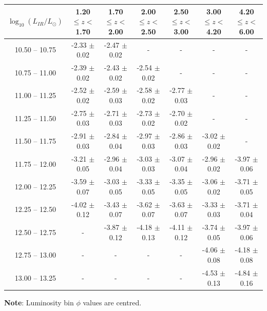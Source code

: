 \begin{table}
\begin{center}
\begin{tabular}{@{}ccccccc@{}}
        \hline
        $\log_{10}(L_{IR}/L_{\odot})$ & 1.20 $\leq z <$ 1.70 & 1.70 $\leq z <$ 2.00 & 2.00 $\leq z <$ 2.50 & 2.50 $\leq z <$ 3.00 & 3.00 $\leq z <$ 4.20 & 4.20 $\leq z <$ 6.00  \\
        \hline
        10.50 -- 10.75 & -2.33 $\pm$ 0.02 & -2.47 $\pm$ 0.02 & - & - & - & - \\
        10.75 -- 11.00 & -2.39 $\pm$ 0.02 & -2.43 $\pm$ 0.02 & -2.54 $\pm$ 0.02 & - & - & - \\
        11.00 -- 11.25 & -2.52 $\pm$ 0.02 & -2.59 $\pm$ 0.03 & -2.58 $\pm$ 0.02 & -2.77 $\pm$ 0.03 & - & - \\
        11.25 -- 11.50 & -2.75 $\pm$ 0.03 & -2.71 $\pm$ 0.03 & -2.73 $\pm$ 0.02 & -2.70 $\pm$ 0.02 & - & - \\
        11.50 -- 11.75 & -2.91 $\pm$ 0.03 & -2.84 $\pm$ 0.04 & -2.97 $\pm$ 0.03 & -2.86 $\pm$ 0.03 & -3.02 $\pm$ 0.02 & - \\
        11.75 -- 12.00 & -3.21 $\pm$ 0.05 & -2.96 $\pm$ 0.04 & -3.03 $\pm$ 0.03 & -3.07 $\pm$ 0.04 & -2.96 $\pm$ 0.02 & -3.97 $\pm$ 0.06 \\
        12.00 -- 12.25 & -3.59 $\pm$ 0.07 & -3.03 $\pm$ 0.05 & -3.33 $\pm$ 0.05 & -3.35 $\pm$ 0.05 & -3.06 $\pm$ 0.02 & -3.71 $\pm$ 0.05 \\
        12.25 -- 12.50 & -4.02 $\pm$ 0.12 & -3.43 $\pm$ 0.07 & -3.62 $\pm$ 0.07 & -3.63 $\pm$ 0.07 & -3.33 $\pm$ 0.03 & -3.71 $\pm$ 0.04 \\
        12.50 -- 12.75 & -                & -3.87 $\pm$ 0.12 & -4.18 $\pm$ 0.13 & -4.11 $\pm$ 0.12 & -3.74 $\pm$ 0.05 & -3.97 $\pm$ 0.06 \\
        12.75 -- 13.00 & -                & -                & -                & -                & -4.06 $\pm$ 0.08 & -4.18 $\pm$ 0.08 \\
        13.00 -- 13.25 & -                & -                & -                & -                & -4.53 $\pm$ 0.13 & -4.84 $\pm$ 0.16
        \botrule
    \end{tabular}
    \end{center}
    \begin{tabnote}
        {\textbf{Note}: Luminosity bin $\phi$ values are centred.}\tnp
    \end{tabnote}
\end{table}

